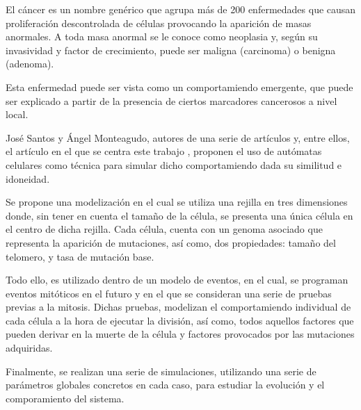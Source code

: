 El cáncer es un nombre genérico que agrupa más de 200 enfermedades que causan proliferación
descontrolada de células provocando la aparición de masas anormales. A toda masa anormal se
le conoce como neoplasia y, según su invasividad y factor de crecimiento, puede ser maligna
(carcinoma) o benigna (adenoma).

Esta enfermedad puede ser vista como un comportamiendo emergente, que puede ser explicado a
partir de la presencia de ciertos marcadores cancerosos a nivel local.

José Santos y Ángel Monteagudo, autores de una serie de artículos y, entre ellos, el artículo
en el que se centra este trabajo \cite{jsantos-amonteagudo-1-2014}, proponen el uso de autómatas
celulares como técnica para simular dicho comportamiendo dada su similitud e idoneidad.

Se propone una modelización en el cual se utiliza una rejilla en tres dimensiones donde, sin
tener en cuenta el tamaño de la célula, se presenta una única célula en el centro de dicha
rejilla. Cada célula, cuenta con un genoma asociado que representa la aparición de mutaciones,
así como, dos propiedades: tamaño del telomero, y tasa de mutación base.

Todo ello, es utilizado dentro de un modelo de eventos, en el cual, se programan eventos mitóticos
en el futuro y en el que se consideran una serie de pruebas previas a la mitosis. Dichas pruebas,
modelizan el comportamiendo individual de cada célula a la hora de ejecutar la división, así como,
todos aquellos factores que pueden derivar en la muerte de la célula y factores provocados
por las mutaciones adquiridas.

Finalmente, se realizan una serie de simulaciones, utilizando una serie de parámetros globales
concretos en cada caso, para estudiar la evolución y el comporamiento del sistema.
